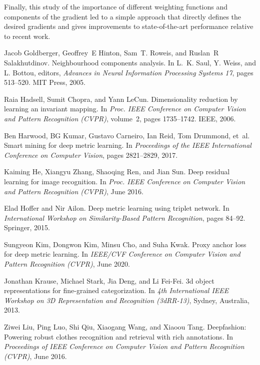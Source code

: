 \documentclass[10pt,twocolumn,letterpaper]{article}
\begin{document}
Finally, this study of the importance of different weighting functions and components of the gradient led to a simple approach that directly defines the desired gradients and gives improvements to state-of-the-art performance relative to recent work.

\begin{thebibliography}{10}\itemsep=-1pt

Jacob Goldberger, Geoffrey~E Hinton, Sam~T. Roweis, and Ruslan~R Salakhutdinov.
\newblock Neighbourhood components analysis.
\newblock In L.~K. Saul, Y. Weiss, and L. Bottou, editors, {\em Advances in
  Neural Information Processing Systems 17}, pages 513--520. MIT Press, 2005.

Raia Hadsell, Sumit Chopra, and Yann LeCun.
\newblock Dimensionality reduction by learning an invariant mapping.
\newblock In {\em Proc. IEEE Conference on Computer Vision and Pattern
  Recognition (CVPR)}, volume~2, pages 1735--1742. IEEE, 2006.

Ben Harwood, BG Kumar, Gustavo Carneiro, Ian Reid, Tom Drummond, et~al.
\newblock Smart mining for deep metric learning.
\newblock In {\em Proceedings of the IEEE International Conference on Computer
  Vision}, pages 2821--2829, 2017.

Kaiming He, Xiangyu Zhang, Shaoqing Ren, and Jian Sun.
\newblock Deep residual learning for image recognition.
\newblock In {\em Proc. IEEE Conference on Computer Vision and Pattern
  Recognition (CVPR)}, June 2016.

Elad Hoffer and Nir Ailon.
\newblock Deep metric learning using triplet network.
\newblock In {\em International Workshop on Similarity-Based Pattern
  Recognition}, pages 84--92. Springer, 2015.

Sungyeon Kim, Dongwon Kim, Minsu Cho, and Suha Kwak.
\newblock Proxy anchor loss for deep metric learning.
\newblock In {\em IEEE/CVF Conference on Computer Vision and Pattern
  Recognition (CVPR)}, June 2020.

Jonathan Krause, Michael Stark, Jia Deng, and Li Fei-Fei.
\newblock 3d object representations for fine-grained categorization.
\newblock In {\em 4th International IEEE Workshop on 3D Representation and
  Recognition (3dRR-13)}, Sydney, Australia, 2013.

Ziwei Liu, Ping Luo, Shi Qiu, Xiaogang Wang, and Xiaoou Tang.
\newblock Deepfashion: Powering robust clothes recognition and retrieval with
  rich annotations.
\newblock In {\em Proceedings of IEEE Conference on Computer Vision and Pattern
  Recognition (CVPR)}, June 2016.


\end{thebibliography}
\end{document}

